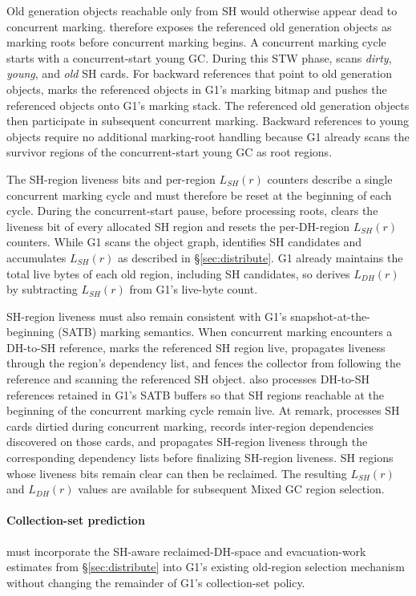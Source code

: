 Old generation objects reachable only from SH would otherwise appear dead to concurrent marking.
\chipperName{} therefore exposes the referenced old generation objects as marking roots before concurrent marking begins.
A concurrent marking cycle starts with a concurrent-start young GC.
During this STW phase, \chipperName{} scans \emph{dirty}, \emph{young}, and \emph{old} SH cards.
For backward references that point to old generation objects, \chipperName{} marks the referenced objects in G1's marking bitmap and pushes the referenced objects onto G1's marking stack.
The referenced old generation objects then participate in subsequent concurrent marking.
Backward references to young objects require no additional marking-root handling because G1 already scans the survivor regions of the concurrent-start young GC as root regions.

The SH-region liveness bits and per-region $L_{SH}(r)$ counters describe a single concurrent marking cycle and must therefore be reset at the beginning of each cycle.
During the concurrent-start pause, before processing roots, \chipperName{} clears the liveness bit of every allocated SH region and resets the per-DH-region $L_{SH}(r)$ counters.
While G1 scans the object graph, \chipperName{} identifies SH candidates and accumulates $L_{SH}(r)$ as described in \S\ref{sec:distribute}.
G1 already maintains the total live bytes of each old region, including SH candidates, so \chipperName{} derives $L_{DH}(r)$ by subtracting $L_{SH}(r)$ from G1's live-byte count.

SH-region liveness must also remain consistent with G1's snapshot-at-the-beginning (SATB) marking semantics.
When concurrent marking encounters a DH-to-SH reference, \chipperName{} marks the referenced SH region live, propagates liveness through the region's dependency list, and fences the collector from following the reference and scanning the referenced SH object.
\chipperName{} also processes DH-to-SH references retained in G1's SATB buffers so that SH regions reachable at the beginning of the concurrent marking cycle remain live.
At remark, \chipperName{} processes SH cards dirtied during concurrent marking, records inter-region dependencies discovered on those cards, and propagates SH-region liveness through the corresponding dependency lists before finalizing SH-region liveness.
SH regions whose liveness bits remain clear can then be reclaimed.
The resulting $L_{SH}(r)$ and $L_{DH}(r)$ values are available for subsequent Mixed GC region selection.

\paragraph{\textbf{Collection-set prediction}}
\chipperName{} must incorporate the SH-aware reclaimed-DH-space and evacuation-work estimates from \S\ref{sec:distribute} into G1's existing old-region selection mechanism without changing the remainder of G1's collection-set policy.

